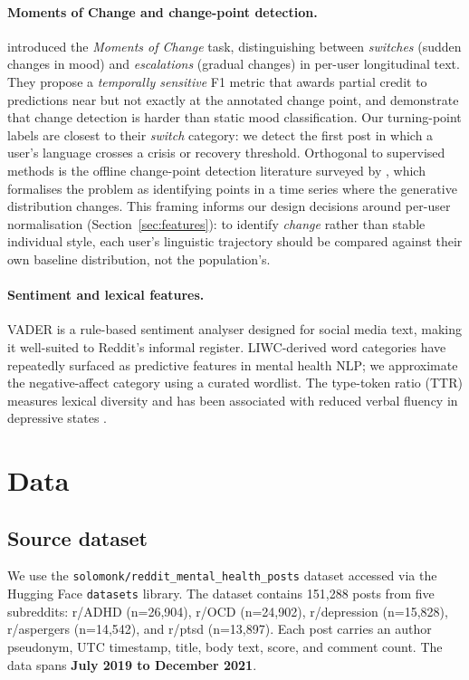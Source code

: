 \documentclass[11pt]{article}
\begin{document}
\paragraph{Moments of Change and change-point detection.}
\citet{tsakalidis2022identifying} introduced the \emph{Moments of Change}
task, distinguishing between \emph{switches} (sudden changes in mood)
and \emph{escalations} (gradual changes) in per-user longitudinal text.
They propose a \emph{temporally sensitive} F1 metric that awards partial
credit to predictions near but not exactly at the annotated change point,
and demonstrate that change detection is harder than static mood
classification.
Our turning-point labels are closest to their \emph{switch} category:
we detect the first post in which a user's language crosses a
crisis or recovery threshold.
Orthogonal to supervised methods is the offline change-point detection
literature surveyed by \citet{vandenburg2020survey}, which formalises
the problem as identifying points in a time series where the generative
distribution changes.
This framing informs our design decisions around per-user normalisation
(Section~\ref{sec:features}): to identify \emph{change} rather than
stable individual style, each user's linguistic trajectory should be
compared against their own baseline distribution, not the population's.

\paragraph{Sentiment and lexical features.}
VADER \citep{hutto2014vader} is a rule-based sentiment analyser designed
for social media text, making it well-suited to Reddit's informal register.
LIWC-derived word categories \citep{pennebaker2015development} have
repeatedly surfaced as predictive features in mental health NLP; we
approximate the negative-affect category using a curated wordlist.
The type-token ratio (TTR) measures lexical diversity and has been
associated with reduced verbal fluency in depressive states
\citep{rude2004language}.

\section{Data}
\label{sec:data}

\subsection{Source dataset}
We use the \texttt{solomonk/reddit\_mental\_health\_posts} dataset
\citep{solomonk2022dataset} accessed via the Hugging Face \texttt{datasets}
library.
The dataset contains 151{,}288 posts from five subreddits:
r/ADHD (n=26{,}904), r/OCD (n=24{,}902), r/depression (n=15{,}828),
r/aspergers (n=14{,}542), and r/ptsd (n=13{,}897).
Each post carries an author pseudonym, UTC timestamp, title, body text,
score, and comment count.
The data spans \textbf{July 2019 to December 2021}.
\end{document}
